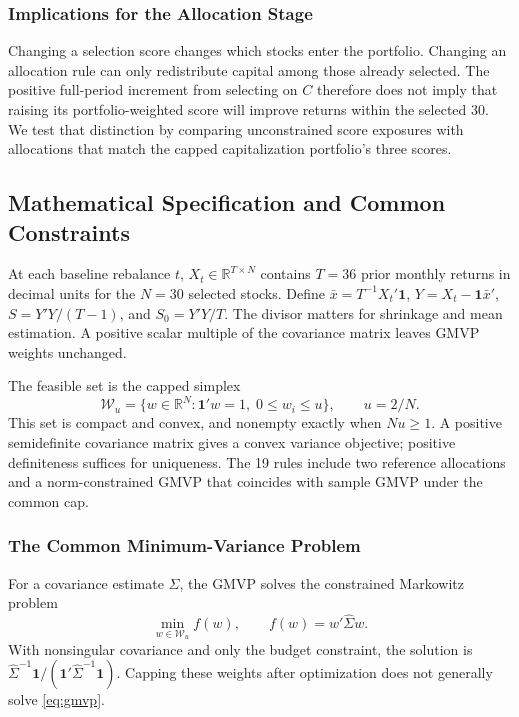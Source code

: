 \documentclass[letterpaper,journal]{IEEEtran}
\newcommand{\R}{\mathbb{R}}
\begin{document}
\subsubsection{Implications for the Allocation Stage}
Changing a selection score changes which stocks enter the portfolio. Changing an allocation rule can only redistribute capital among those already selected. The positive full-period increment from selecting on $C$ therefore does not imply that raising its portfolio-weighted score will improve returns within the selected 30. We test that distinction by comparing unconstrained score exposures with allocations that match the capped capitalization portfolio's three scores.

\subsection{Mathematical Specification and Common Constraints}\label{sec:allocation}
At each baseline rebalance $t$, $X_t\in\R^{T\times N}$ contains $T=36$ prior monthly returns in decimal units for the $N=30$ selected stocks. Define $\bar x=T^{-1}X_t'\mathbf1$, $Y=X_t-\mathbf1\bar x'$, $S=Y'Y/(T-1)$, and $S_0=Y'Y/T$. The divisor matters for shrinkage and mean estimation. A positive scalar multiple of the covariance matrix leaves GMVP weights unchanged.

The feasible set is the capped simplex
\begin{equation}\label{eq:feasible}
 \mathcal W_u=\{w\in\R^N:\mathbf1'w=1,\;0\leq w_i\leq u\},\qquad u=2/N.
\end{equation}
This set is compact and convex, and nonempty exactly when $Nu\geq1$. A positive semidefinite covariance matrix gives a convex variance objective; positive definiteness suffices for uniqueness. The 19 rules include two reference allocations and a norm-constrained GMVP that coincides with sample GMVP under the common cap.

\subsubsection{The Common Minimum-Variance Problem}
For a covariance estimate $\widehat\Sigma$, the GMVP solves the constrained Markowitz problem \cite{markowitz}
\begin{equation}\label{eq:gmvp}
 \min_{w\in\mathcal W_u} f(w),\qquad f(w)=w'\widehat\Sigma w.
\end{equation}
With nonsingular covariance and only the budget constraint, the solution is $\widehat\Sigma^{-1}\mathbf1/(\mathbf1'\widehat\Sigma^{-1}\mathbf1)$. Capping these weights after optimization does not generally solve \eqref{eq:gmvp}.
\end{document}
